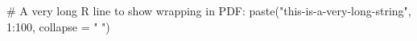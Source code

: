 \documentclass[
  letterpaper,
  DIV=11,
  numbers=noendperiod]{scrartcl}
\newenvironment{Shaded}{\begin{snugshade}}{\end{snugshade}}
\newcommand{\AttributeTok}[1]{\textcolor[rgb]{0.40,0.45,0.13}{#1}}
\newcommand{\CommentTok}[1]{\textcolor[rgb]{0.37,0.37,0.37}{#1}}
\newcommand{\DecValTok}[1]{\textcolor[rgb]{0.68,0.00,0.00}{#1}}
\newcommand{\DocumentationTok}[1]{\textcolor[rgb]{0.37,0.37,0.37}{\textit{#1}}}
\newcommand{\FunctionTok}[1]{\textcolor[rgb]{0.28,0.35,0.67}{#1}}
\newcommand{\NormalTok}[1]{\textcolor[rgb]{0.00,0.23,0.31}{#1}}
\newcommand{\OtherTok}[1]{\textcolor[rgb]{0.00,0.23,0.31}{#1}}
\newcommand{\SpecialCharTok}[1]{\textcolor[rgb]{0.37,0.37,0.37}{#1}}
\newcommand{\StringTok}[1]{\textcolor[rgb]{0.13,0.47,0.30}{#1}}
\begin{document}
\begin{Shaded}
\end{Shaded}

\begin{Shaded}
\begin{Highlighting}[]
\CommentTok{\# A very long R line to show wrapping in PDF:}
\FunctionTok{paste}\NormalTok{(}\StringTok{"this{-}is{-}a{-}very{-}long{-}string"}\NormalTok{, }\DecValTok{1}\SpecialCharTok{:}\DecValTok{100}\NormalTok{, }\AttributeTok{collapse =} \StringTok{" "}\NormalTok{)}
\end{Highlighting}
\end{Shaded}
\end{document}
